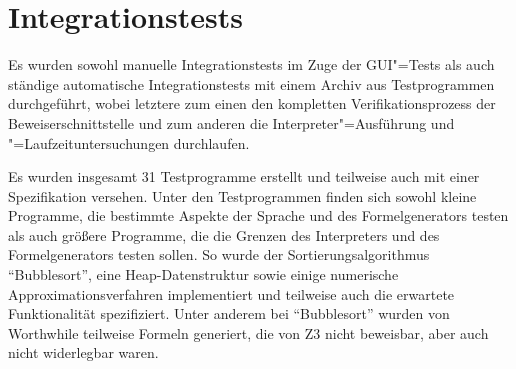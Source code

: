 \section{Integrationstests}

Es wurden sowohl manuelle Integrationstests im Zuge der GUI"=Tests als
auch ständige automatische Integrationstests mit einem Archiv aus
Testprogrammen durchgeführt, wobei letztere zum einen den kompletten
Verifikationsprozess der Beweiserschnittstelle und zum anderen die
Interpreter"=Ausführung und "=Laufzeituntersuchungen durchlaufen.

Es wurden insgesamt 31 Testprogramme erstellt und teilweise auch mit einer Spezifikation versehen. Unter den Testprogrammen finden sich sowohl kleine Programme, die bestimmte Aspekte der Sprache und des Formelgenerators testen als auch größere Programme, die die Grenzen des Interpreters und des Formelgenerators testen sollen. So wurde der Sortierungsalgorithmus ``Bubblesort'', eine Heap-Datenstruktur sowie einige numerische Approximationsverfahren implementiert und teilweise auch die erwartete Funktionalität spezifiziert. Unter anderem bei ``Bubblesort'' wurden von Worthwhile teilweise Formeln generiert, die von Z3 nicht beweisbar, aber auch nicht widerlegbar waren.
